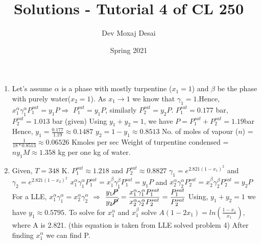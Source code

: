 \documentclass[12pt]{article}
\title{Solutions - Tutorial 4 of CL 250}
\author{Dev Moxaj Desai}%
\date{Spring 2021}
\begin{document}
\maketitle
\begin{enumerate}[leftmargin=*]
\item Let's assume $\alpha$ is a phase with mostly turpentine ($x_1 = 1$) and $\beta$ be the phase with purely water($x_2 = 1$).\newline
As $x_1 \rightarrow 1$ we know that $\gamma_1 = 1$.\newline Hence,  $x_1^{\alpha}\gamma_1^\alpha P_1^{sat} = y_1 P$$\Rightarrow$  $P_1^{sat} = y_1 P$, similarly $P_2^{sat} = y_2 P$.
\newline $P_1^{sat} = 0.177$ bar, $P_2^{sat} = 1.013$ bar (given)\newline
Using $y_1 + y_2 = 1$, we have $P = P_1^{sat} + P_2^{sat} = 1.19$bar \newline
Hence, $y_1 = \frac{0.177}{1.19} \approx 0.1487$\newline
$y_2 = 1 - y_1 \approx 0.8513$\newline
No. of moles of vapour ($n$) = $  \frac{1}{18*0.8513} \approx 0.06526$ Kmoles per sec\newline
Weight of turpentine condensed = $ny_1M \approx 1.358 $ kg per one kg of water.

\item Given, $T = 348$ K.
$P_1^{sat} \approx 1.218$ and $P_2^{sat} \approx 0.8827$\newline
$\gamma_1 = e^{2.821 (1-x_1)^2}$ and $\gamma_2 = e^{2.821 (1-x_2)^2}$\newline
$x_1^{\alpha}\gamma_1^\alpha P_1^{sat} = x_1^{\beta}\gamma_1^\beta P_1^{sat} = y_1 P$ and $x_2^{\alpha}\gamma_2^\alpha P_2^{sat} = x_2^{\beta}\gamma_2^\beta P_2^{sat} = y_2 P$\newline
For a LLE, $x_1^{\alpha}\gamma_1^\alpha = x_2^{\alpha}\gamma_2^\alpha$ $\Rightarrow$ $\displaystyle \frac{ y_1 \cancel{P}}{y_2 \cancel{P}} =\displaystyle \frac{x_1^{\alpha}\gamma_1^\alpha P_1^{sat}}{x_2^{\alpha}\gamma_2^\alpha P_2^{sat}} = \displaystyle \frac{P_1^{sat}}{P_2^{sat}}$\newline
Using, $y_1 + y_2 = 1$ we have $y_1 \approx 0.5795$.\newline
To solve for $x_1^{\alpha}$ and $x_1^{\beta}$ solve $A(1-2x_1) = ln(\frac{1-x_1}{x_1})$, where A is 2.821. (this equation is taken from LLE solved problem 4)\newline
After finding $x_1^{\alpha}$ we can find P.


\end{enumerate}
\end{document}

